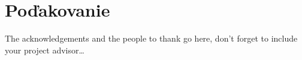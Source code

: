\thispagestyle{empty}
\section*{Poďakovanie}

The acknowledgements and the people to thank go here, don't forget to include your project advisor\ldots

\newpage
\thispagestyle{empty}
\mbox{}
\newpage
